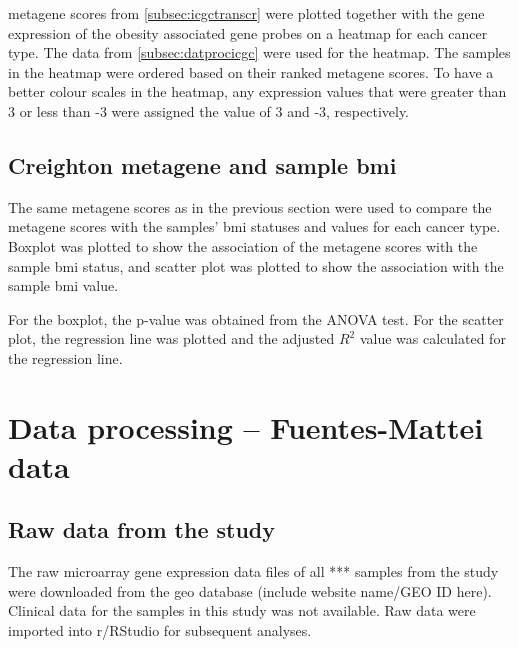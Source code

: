 \Gls{metagene} scores from \cref{subsec:icgctranscr} were plotted together with the gene expression of the obesity associated gene probes on a heatmap for each cancer type.
The data from \cref{subsec:datprocicgc} were used for the heatmap.
The samples in the heatmap were ordered based on their ranked \gls{metagene} scores.
To have a better colour scales in the heatmap, any expression values that were greater than 3 or less than -3 were assigned the value of 3 and -3, respectively.

\subsection{Creighton metagene and sample \gls{bmi}}
\label{subsec:crmetaicgcge}

The same \gls{metagene} scores as in the previous section were used to compare the \gls{metagene} scores with the samples' \gls{bmi} statuses and values for each cancer type.
Boxplot was plotted to show the association of the \gls{metagene} scores with the sample \gls{bmi} status, and scatter plot was plotted to show the association with the sample \gls{bmi} value.

For the boxplot, the p-value was obtained from the ANOVA test.
For the scatter plot, the regression line was plotted and the adjusted $R^2$ value was calculated for the regression line.


\section{Data processing -- Fuentes-Mattei data}
\label{sec:dataprocessingfm}

\subsection{Raw data from the \citet{Fuentes-Mattei2014} study}
\label{subsec:rawdatafm}

The raw microarray gene expression data files of all *** samples from the  \citet{Fuentes-Mattei2014} study were downloaded from the \gls{geo} database (include website name/GEO ID here).
Clinical data for the samples in this study was not available.
Raw data were imported into \gls{r}/RStudio for subsequent analyses.


